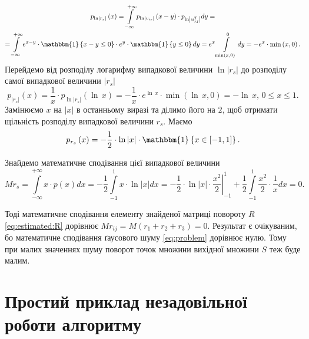 \begin{equation*}
  \begin{gathered}
    p_{\ln \left| r_s \right|} \left( x \right) =
    \int \limits_{-\infty }^{+\infty }
      p_{\ln \left| v_{is} \right|}\left( x - y \right) \cdot
      p_{\ln \left| u_{sj}^T\right|}
    dy = \\
    = \int \limits_{-\infty}^{+\infty}
      e^{x-y} \cdot \mathbbm{1} \left\{ x - y \leq 0 \right\} \cdot
      e^y \cdot \mathbbm{1} \left\{ y \leq 0 \right\}
    dy =
    e^x \int \limits_{\min \left( x, 0 \right)}^0 dy =
    -e^x \cdot \min \left( x, 0 \right).
  \end{gathered}
\end{equation*}
Перейдемо від розподілу логарифму випадкової величини $ \ln \left| r_s \right|$
до розподілу самої випадкової величини $\left| r_s \right|$
\begin{equation*}
  p_{\left| r_s \right|} \left( x \right) =
  \frac{1}{x} \cdot p_{\ln \left| r_s \right|} \left( \ln \, x \right) =
  -\frac{1}{x} \cdot e^{\ln \, x} \cdot \min \left( \ln\, x, 0 \right) =
  -\ln \, x, \, 0 \leq x \leq 1.
\end{equation*}
Замінюємо $x$ на $\left| x \right| $ в останньому виразі та ділимо його на $2$,
щоб отримати щільність розподілу випадкової величини $r_s$.
Маємо
\begin{equation*}
  p_{r_s} \left( x \right) =
  -\frac{1}{2} \cdot
  \ln \left| x \right| \cdot \mathbbm{1} \left\{ x \in \left[ -1, 1 \right] \right\}.
\end{equation*}

Знайдемо математичне сподівання цієї випадкової величини
\begin{equation*}
  Mr_s =
  \int \limits_{-\infty}^{+\infty} x \cdot p \left( x \right) dx =
  -\frac{1}{2} \int \limits_{-1}^1 x \cdot \ln \left| x \right| dx =
  -\frac{1}{2} \cdot
  \left. \ln \left| x \right| \cdot \frac{x^2}{2} \right|_{-1}^1 +
  \frac{1}{2} \int \limits_{-1}^1 \frac{x^2}{2} \cdot \frac{1}{x} dx =
  0.
\end{equation*}

Тоді математичне сподівання елементу знайденої матриці повороту $R$
\eqref{eq:estimated:R} дорівнює
$Mr_{ij} =
  M \left( r_1 + r_2 + r_3 \right) =
  0$.
Результат є очікуваним,
бо математичне сподівання ґаусового шуму \eqref{eq:problem} дорівнює нулю.
Тому при малих значеннях шуму поворот точок множини вихідної множини $S$ теж
буде малим.

\section{Простий приклад незадовільної роботи алгоритму}

